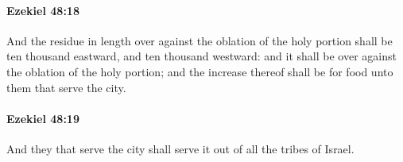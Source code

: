 		\paragraph{Ezekiel 48:18} %
			\label{EZEKIEL-48-18}

			And the residue in length over against the oblation of the holy portion shall be ten thousand eastward, and ten thousand westward: and it shall be over against the oblation of the holy portion; and the increase thereof shall be for food unto them that serve the city.


		\paragraph{Ezekiel 48:19} %
			\label{EZEKIEL-48-19}

			And they that serve the city shall serve it out of all the tribes of Israel.


